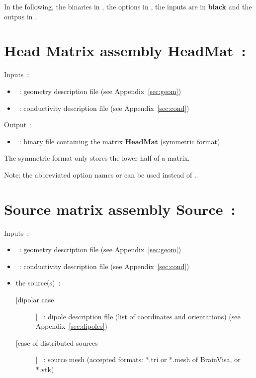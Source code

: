 \noindent
In the following, the binaries in , the options in , the inputs are in  \textbf{black} and the outpus in  . 

\section{Head Matrix assembly $\mathbf{HeadMat}$~:}
\label{sect: command assemble HeadMat}

\noindent
Inputs~: 
\begin{itemize}
    \item {}~: geometry description file (see Appendix~\ref{sec:geom})
    \item {}~: conductivity description file (see Appendix~\ref{sec:cond})
\end{itemize}

\noindent
Output~:
\begin{itemize}
    \item {}~: binary file containing the matrix $\mathbf{HeadMat}$ (symmetric format).
\end{itemize}
The symmetric format only stores the lower half of a matrix.
\medskip

\noindent
{}
\medskip
Note: the abbreviated option names  or  can be used instead of .

\section{Source matrix assembly $\mathbf{Source}$~:}
\label{sect: command assemble SourceMat}

\noindent
Inputs~: 
\begin{itemize}
    \item {}~: geometry description file (see Appendix~\ref{sec:geom})
    \item {}~: conductivity description file (see Appendix~\ref{sec:cond})
    \item the source(s)~:
        \begin{description}
            \item [[dipolar case]] ~: dipole description file (list of coordinates and orientations)
                                    (see Appendix~\ref{sec:dipoles}) 
            \item [[case of distributed sources]]  ~: source mesh (accepted formats:  *.tri or *.mesh of BrainVisa, or *.vtk) 
        \end{description}
\end{itemize}

